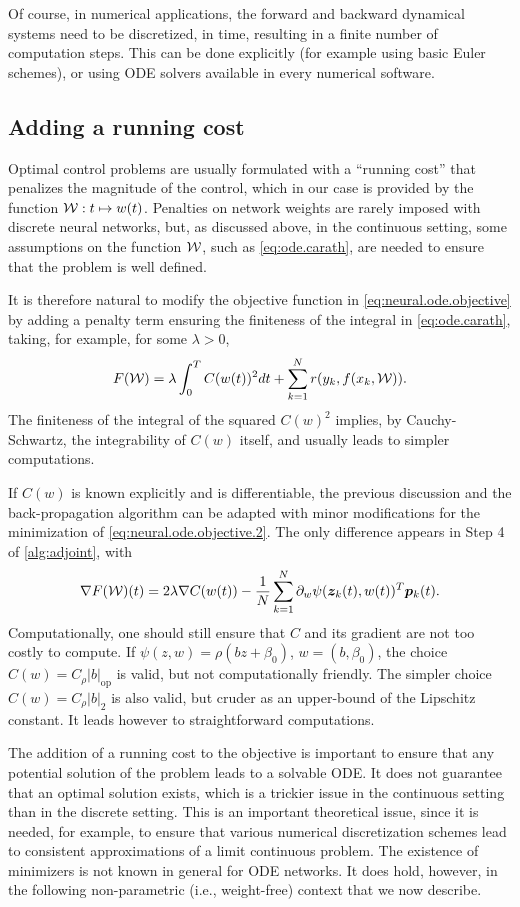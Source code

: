 Of course, in numerical applications, the forward and backward dynamical systems need to be discretized, in time, resulting in a finite number of computation steps. This can be done explicitly (for example using basic Euler schemes), or using ODE solvers \citep{chen2019neural} available in every numerical software. 


\subsection{Adding a running cost}
Optimal control problems are usually formulated with a ``running cost'' that penalizes the magnitude of the control, which in our case is provided by the function ${\mathcal W}: t \mapsto w(t)$. Penalties on network weights are rarely imposed with discrete neural networks, but, as discussed above, in the continuous setting, some assumptions on the function ${\mathcal W}$, such as \cref{eq:ode.carath}, are needed to ensure that the problem is well defined.


It is therefore natural to modify the objective function in \cref{eq:neural.ode.objective} by adding a penalty term ensuring the finiteness of the integral in \cref{eq:ode.carath}, taking, for example, for some $\lambda>0$,
\begin{equation}
\label{eq:neural.ode.objective.2}
F({\mathcal W}) = \lambda \int_0^T C(w(t))^2 dt +  \sum_{k=1}^N r(y_k, f(x_k, {\mathcal W})).
\end{equation}
The finiteness of the integral of the squared $C(w)^2$ implies, by Cauchy-Schwartz, the integrability of $C(w)$ itself, and usually leads to simpler computations.

If $C(w)$ is known explicitly and is differentiable, the previous discussion and the back-propagation algorithm can be adapted with minor modifications for the minimization of \cref{eq:neural.ode.objective.2}. The only difference appears in Step 4 of \cref{alg:adjoint}, with
\[
\nabla F({\mathcal W})(t) = 2\lambda \nabla C(w(t)) -   \frac1N \sum_{k=1}^N \partial_w \psi({\bm{z}}_k(t), w(t))^T {\bm{p}}_k(t).
\]
Computationally, one should still ensure that $C$ and its gradient are not too costly to compute. If $\psi(z, w) = \rho(bz + \beta_0)$, $w = (b, \beta_0)$, the choice
$C(w) = C_\rho |b|_{\mathrm{op}}$ is valid, but not computationally friendly. The simpler choice $C(w) = C_\rho |b|_{2}$ is also valid, but cruder as an upper-bound of the Lipschitz constant. It leads however to straightforward computations.

The addition of a running cost to the objective is important to ensure that any potential solution of the problem leads to a solvable ODE. It does not guarantee that an optimal solution exists, which is a trickier issue in the continuous setting than in the discrete setting. This is an important theoretical issue, since it is needed, for example, to ensure that various numerical discretization schemes lead to consistent approximations of a limit continuous problem. The existence of minimizers is not known in general for ODE networks. It does hold, however, in the following  non-parametric (i.e., weight-free) context that we now describe.   

